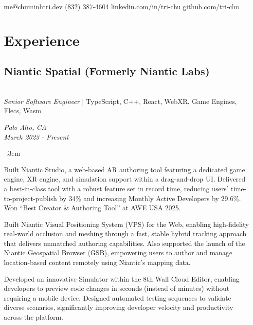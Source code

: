 \documentclass{article}
\makeatletter
\def\faEmail{{\FAFR \symbol{"F0E0}}} %
\def\faPhone{{\FAFR \symbol{"F095}}} %
\def\faLinkedin{{\FAB \symbol{"F08C}}} %
\def\faGithub{{\FAB \symbol{"F09B}}} %
\let\olditemize=\itemize \let\endolditemize=\enditemize
\renewenvironment{itemize}{\olditemize[topsep=0em] \itemsep-.3em}{\endolditemize}
\newcommand{\link}[1]{\href{https://#1}{#1}}
\newenvironment{twocolentry}[2][]{
    \def\secondColumn{#2}
    \raggedright
    \setcolumnwidth{\fill, 6cm}
    \begin{paracol}{2}
}{
    \switchcolumn \raggedleft \secondColumn
    \end{paracol}
} %
\renewcommand{\maketitle}{
  \begin{flushleft}
    \Huge\bfseries\theauthor
  \end{flushleft}
  \begin{bfseries}
    \faEmail    \hspace{1pt} \href{mailto:me@chuminhtri.dev}{me@chuminhtri.dev} \quad
    \faPhone    \hspace{1pt} (832) 387-4604 \quad
    \faLinkedin \hspace{1pt} \link{linkedin.com/in/tri-chu} \quad
    \faGithub   \hspace{1pt} \link{github.com/tri-chu}
  \end{bfseries}
}
\makeatother
\begin{document}
\author{\color{accentcolor}Tri Chu}
\maketitle


\section{Experience}

\begin{twocolentry}{
  \textit{Palo Alto, CA} \\
  \textit{March 2023 - Present}
}
\subsection{Niantic Spatial (Formerly Niantic Labs)}\hfill\\
\textit{Senior Software Engineer} | TypeScript, C++, React, WebXR, Game Engines, Flecs, Wasm 
\end{twocolentry}

\begin{itemize}
  \item Built Niantic Studio, a web-based AR authoring tool featuring a dedicated game engine, XR
  engine, and simulation support within a drag-and-drop UI. Delivered a best-in-class tool with a
  robust feature set in record time, reducing users’ time-to-project-publish by 34\% and increasing
  Monthly Active Developers by 29.6\%. Won “Best Creator \& Authoring Tool” at AWE USA 2025.
  \item Built Niantic Visual Positioning System (VPS) for the Web, enabling high-fidelity real-world
  occlusion and meshing through a fast, stable hybrid tracking approach that delivers unmatched
  authoring capabilities. Also supported the launch of the Niantic Geospatial Browser (GSB),
  empowering users to author and manage location-based content remotely using Niantic’s mapping
  data.
  \item Developed an innovative Simulator within the 8th Wall Cloud Editor, enabling developers to
  preview code changes in seconds (instead of minutes) without requiring a mobile device. Designed
  automated testing sequences to validate diverse scenarios, significantly improving developer
  velocity and productivity across the platform.
\end{itemize}
\end{document}
